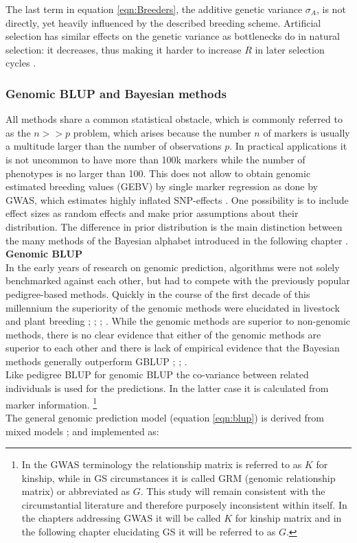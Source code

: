 The last term in equation \ref{eqn:Breeders}, the additive genetic variance $\sigma_A$, is
not directly, yet heavily influenced by the described breeding scheme. Artificial
selection has similar effects on the genetic variance as bottlenecks do in natural
selection: it decreases, thus making it harder to increase $R$ in later selection cycles
\cite{walsh2018}.

\subsubsection{Genomic BLUP and Bayesian methods}\label{blup:bayes}

All methods share a common statistical obstacle, which is commonly referred to as the
$n >> p$ problem, which arises because the number $n$ of markers is usually a multitude
larger than the number of observations $p$. In practical applications it is not uncommon
to have more than 100k markers while the number of phenotypes is no larger than 100. This
does not allow to obtain genomic estimated breeding values (GEBV) by single marker
regression as done by GWAS, which estimates highly inflated SNP-effects
\cite{korte2013advantages}. One possibility is to include effect sizes as random effects
and make prior assumptions about their distribution. The difference in prior distribution
is the main distinction between the many methods of the Bayesian alphabet introduced in
the following chapter \cite{gianola2013}.\\

\noindent
\textbf{Genomic BLUP} \\ In the early years of research on genomic prediction, algorithms
were not solely benchmarked against each other, but had to compete with the previously
popular pedigree-based methods. Quickly in the course of the first decade of this
millennium the superiority of the genomic methods were elucidated in livestock and plant
breeding \cite{habier2007impact}; \cite{vanraden2008efficient};
\cite{vanraden2008reliability}; \cite{harris2009genomic}. While the genomic methods are
superior to non-genomic methods, there is no clear evidence that either of the genomic
methods are superior to each other and there is lack of empirical evidence that the
Bayesian methods generally outperform
GBLUP \cite{moser2009comparison}; \cite{bernardo2010breeding}; \cite{azodi2019}. \\
Like pedigree BLUP for genomic BLUP the co-variance between related individuals is used
for the predictions. In the latter case it is calculated from marker information.
\footnote{In the GWAS terminology the relationship matrix is referred to as $K$ for
  kinship, while in GS circumstances it is called GRM (genomic relationship matrix) or
  abbreviated as $G$. This study will remain consistent with the circumstantial literature
  and therefore purposely inconsistent within itself. In the chapters addressing GWAS it
  will be called $K$ for kinship matrix and in the following chapter elucidating GS it
  will be referred to as $G$.}
\\
The general genomic prediction model (equation \ref{eqn:blup}) is derived from mixed
models \cite{henderson1975best}; \cite{vanraden2008efficient} and implemented as:

